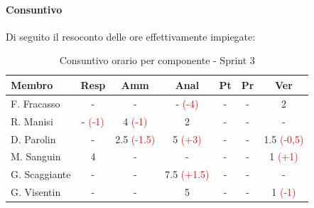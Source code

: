 \documentclass[a4paper,12pt]{article}
\begin{document}
\paragraph{Consuntivo}
Di seguito il resoconto delle ore effettivamente impiegate:

\begin{table}[H]
    \centering
    \renewcommand{\arraystretch}{1.3}
    \small
    \begin{tabularx}{\textwidth}{|l|C|C|C|C|C|C|}
        \hline
        \textbf{Membro} & \textbf{Resp} & \textbf{Amm} & \textbf{Anal} & \textbf{Pt} & \textbf{Pr} & \textbf{Ver} \\
        \hline
        F. Fracasso & - & - & - \textcolor{red}{(-4)} & - & - & 2 \\
        \hline
        R. Manisi & - \textcolor{red}{(-1)} & 4 \textcolor{red}{(-1)} & 2 & - & - & - \\
        \hline
        D. Parolin & - & 2.5 \textcolor{red}{(-1.5)} & 5 \textcolor{red}{(+3)} & - & - & 1.5 \textcolor{red}{(-0,5)}\\
        \hline
        M. Sanguin & 4 & - & - & - & - & 1 \textcolor{red}{(+1)} \\
        \hline
        G. Scaggiante & - & - & 7.5 \textcolor{red}{(+1.5)} & - & - & - \\
        \hline
        G. Visentin & - & - & 5 & - & - & 1 \textcolor{red}{(-1)} \\
        \hline
    \end{tabularx}
    \caption{Consuntivo orario per componente - Sprint 3}
    \label{tab:consuntivo_sprint3}
\end{table}
\end{document}
